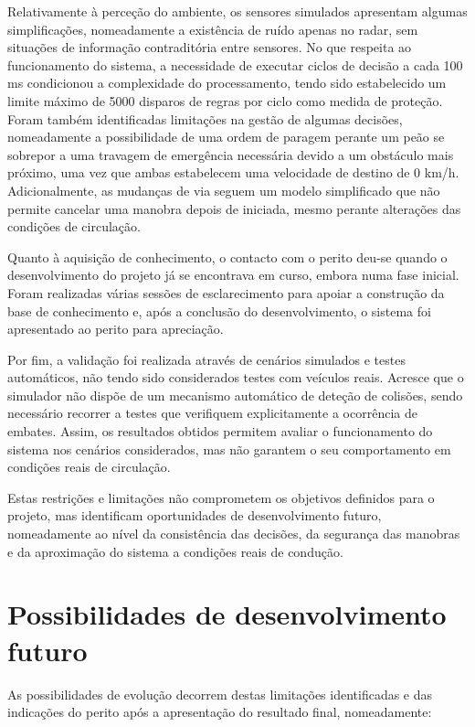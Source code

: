 Relativamente à perceção do ambiente, os sensores simulados apresentam algumas simplificações, nomeadamente a existência de ruído apenas no radar, sem situações de informação contraditória entre sensores. No que respeita ao funcionamento do sistema, a necessidade de executar ciclos de decisão a cada 100 ms condicionou a complexidade do processamento, tendo sido estabelecido um limite máximo de 5000 disparos de regras por ciclo como medida de proteção. Foram também identificadas limitações na gestão de algumas decisões, nomeadamente a possibilidade de uma ordem de paragem perante um peão se sobrepor a uma travagem de emergência necessária devido a um obstáculo mais próximo, uma vez que ambas estabelecem uma velocidade de destino de 0 km/h. Adicionalmente, as mudanças de via seguem um modelo simplificado que não permite cancelar uma manobra depois de iniciada, mesmo perante alterações das condições de circulação.

Quanto à aquisição de conhecimento, o contacto com o perito deu-se quando o desenvolvimento do projeto já se encontrava em curso, embora numa fase inicial. Foram realizadas várias sessões de esclarecimento para apoiar a construção da base de conhecimento e, após a conclusão do desenvolvimento, o sistema foi apresentado ao perito para apreciação.

Por fim, a validação foi realizada através de cenários simulados e testes automáticos, não tendo sido considerados testes com veículos reais. Acresce que o simulador não dispõe de um mecanismo automático de deteção de colisões, sendo necessário recorrer a testes que verifiquem explicitamente a ocorrência de embates. Assim, os resultados obtidos permitem avaliar o funcionamento do sistema nos cenários considerados, mas não garantem o seu comportamento em condições reais de circulação.

Estas restrições e limitações não comprometem os objetivos definidos para o projeto, mas identificam oportunidades de desenvolvimento futuro, nomeadamente ao nível da consistência das decisões, da segurança das manobras e da aproximação do sistema a condições reais de condução.

\section{Possibilidades de desenvolvimento futuro}\label{sec:7.3}

As possibilidades de evolução decorrem destas limitações identificadas e das indicações do perito após a apresentação do resultado final, nomeadamente:

